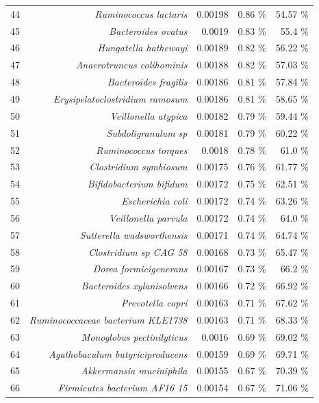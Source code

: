 \documentclass{article}
\begin{document}
\begin{table}
\begin{centering}
\begin{tabular}{|r|r|r|r|r|}
  44 & \textit{Ruminococcus lactaris} & 0.00198 & 0.86 \% & 54.57 \% \\
  45 & \textit{Bacteroides ovatus} & 0.0019 & 0.83 \% & 55.4 \% \\
  46 & \textit{Hungatella hathewayi} & 0.00189 & 0.82 \% & 56.22 \% \\
  47 & \textit{Anaerotruncus colihominis} & 0.00188 & 0.82 \% & 57.03 \% \\
  48 & \textit{Bacteroides fragilis} & 0.00186 & 0.81 \% & 57.84 \% \\
  49 & \textit{Erysipelatoclostridium ramosum} & 0.00186 & 0.81 \% & 58.65 \% \\
  50 & \textit{Veillonella atypica} & 0.00182 & 0.79 \% & 59.44 \% \\
  51 & \textit{Subdoligranulum sp} & 0.00181 & 0.79 \% & 60.22 \% \\
  52 & \textit{Ruminococcus torques} & 0.0018 & 0.78 \% & 61.0 \% \\
  53 & \textit{Clostridium symbiosum} & 0.00175 & 0.76 \% & 61.77 \% \\
  54 & \textit{Bifidobacterium bifidum} & 0.00172 & 0.75 \% & 62.51 \% \\
  55 & \textit{Escherichia coli} & 0.00172 & 0.74 \% & 63.26 \% \\
  56 & \textit{Veillonella parvula} & 0.00172 & 0.74 \% & 64.0 \% \\
  57 & \textit{Sutterella wadsworthensis} & 0.00171 & 0.74 \% & 64.74 \% \\
  58 & \textit{Clostridium sp CAG 58} & 0.00168 & 0.73 \% & 65.47 \% \\
  59 & \textit{Dorea formicigenerans} & 0.00167 & 0.73 \% & 66.2 \% \\
  60 & \textit{Bacteroides xylanisolvens} & 0.00166 & 0.72 \% & 66.92 \% \\
  61 & \textit{Prevotella copri} & 0.00163 & 0.71 \% & 67.62 \% \\
  62 & \textit{Ruminococcaceae bacterium KLE1738} & 0.00163 & 0.71 \% & 68.33 \% \\
  63 & \textit{Monoglobus pectinilyticus} & 0.0016 & 0.69 \% & 69.02 \% \\
  64 & \textit{Agathobaculum butyriciproducens} & 0.00159 & 0.69 \% & 69.71 \% \\
  65 & \textit{Akkermansia muciniphila} & 0.00155 & 0.67 \% & 70.39 \% \\
  66 & \textit{Firmicutes bacterium AF16 15} & 0.00154 & 0.67 \% & 71.06 \% \\

\end{tabular}
\end{centering}
\end{table}
\end{document}
